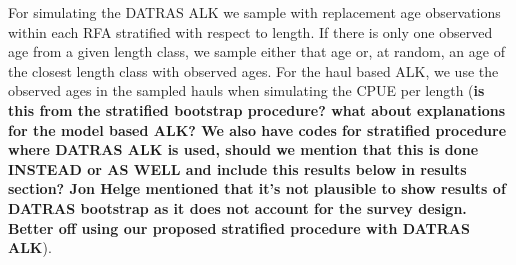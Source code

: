 \documentclass[a4paper 12pt]{article}
\numberwithin{equation}{section}
\begin{document}
For simulating the DATRAS ALK we sample with replacement age observations within each RFA stratified with respect to length. If there is only one observed age from a given length class, we sample either that age or, at random, an age of the closest length class with observed ages. For the haul based ALK, we use the observed ages in the sampled hauls when simulating the CPUE per length ({\bf is this from the stratified bootstrap procedure? what about explanations for the model based ALK? We also have codes for stratified procedure where DATRAS ALK is used, should we mention that this is done INSTEAD or AS WELL and include this results below in results section? Jon Helge mentioned that it's not plausible to show results of DATRAS bootstrap as it does not account for the survey design. Better off using our proposed stratified procedure with DATRAS ALK}).
\end{document}
